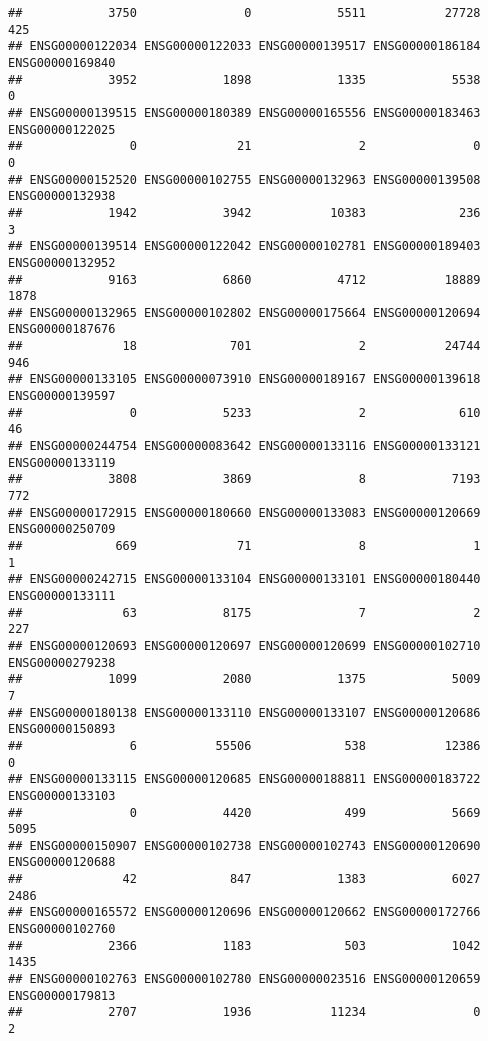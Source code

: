\documentclass[
]{article}
\begin{document}
\begin{verbatim}
##            3750               0            5511           27728             425 
## ENSG00000122034 ENSG00000122033 ENSG00000139517 ENSG00000186184 ENSG00000169840 
##            3952            1898            1335            5538               0 
## ENSG00000139515 ENSG00000180389 ENSG00000165556 ENSG00000183463 ENSG00000122025 
##               0              21               2               0               0 
## ENSG00000152520 ENSG00000102755 ENSG00000132963 ENSG00000139508 ENSG00000132938 
##            1942            3942           10383             236               3 
## ENSG00000139514 ENSG00000122042 ENSG00000102781 ENSG00000189403 ENSG00000132952 
##            9163            6860            4712           18889            1878 
## ENSG00000132965 ENSG00000102802 ENSG00000175664 ENSG00000120694 ENSG00000187676 
##              18             701               2           24744             946 
## ENSG00000133105 ENSG00000073910 ENSG00000189167 ENSG00000139618 ENSG00000139597 
##               0            5233               2             610              46 
## ENSG00000244754 ENSG00000083642 ENSG00000133116 ENSG00000133121 ENSG00000133119 
##            3808            3869               8            7193             772 
## ENSG00000172915 ENSG00000180660 ENSG00000133083 ENSG00000120669 ENSG00000250709 
##             669              71               8               1               1 
## ENSG00000242715 ENSG00000133104 ENSG00000133101 ENSG00000180440 ENSG00000133111 
##              63            8175               7               2             227 
## ENSG00000120693 ENSG00000120697 ENSG00000120699 ENSG00000102710 ENSG00000279238 
##            1099            2080            1375            5009               7 
## ENSG00000180138 ENSG00000133110 ENSG00000133107 ENSG00000120686 ENSG00000150893 
##               6           55506             538           12386               0 
## ENSG00000133115 ENSG00000120685 ENSG00000188811 ENSG00000183722 ENSG00000133103 
##               0            4420             499            5669            5095 
## ENSG00000150907 ENSG00000102738 ENSG00000102743 ENSG00000120690 ENSG00000120688 
##              42             847            1383            6027            2486 
## ENSG00000165572 ENSG00000120696 ENSG00000120662 ENSG00000172766 ENSG00000102760 
##            2366            1183             503            1042            1435 
## ENSG00000102763 ENSG00000102780 ENSG00000023516 ENSG00000120659 ENSG00000179813 
##            2707            1936           11234               0               2 

\end{verbatim}
\end{document}
